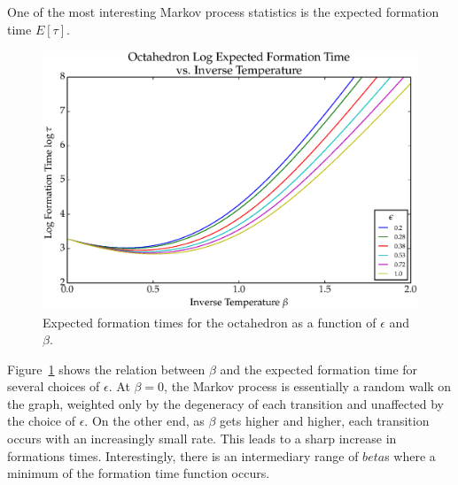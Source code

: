 One of the most interesting Markov process statistics is the expected formation time $E[\tau]$.
\begin{figure}[ht]
\centering
  \includegraphics[scale=0.6]{images/octahedron_tau.eps}
\caption{Expected formation times for the octahedron as a function of $\epsilon$ and $\beta$.}
\label{fig:OctaTau}
\end{figure}
Figure~\ref{fig:OctaTau} shows the relation between $\beta$ and the expected formation time for several choices of $\epsilon$. At $\beta = 0$, the Markov process is essentially a random walk on the graph, weighted only by the degeneracy of each transition and unaffected by the choice of $\epsilon$. On the other end, as $\beta$ gets higher and higher, each transition occurs with an increasingly small rate. This leads to a sharp increase in formations times. Interestingly, there is an intermediary range of $beta$s where a minimum of the formation time function occurs. 
